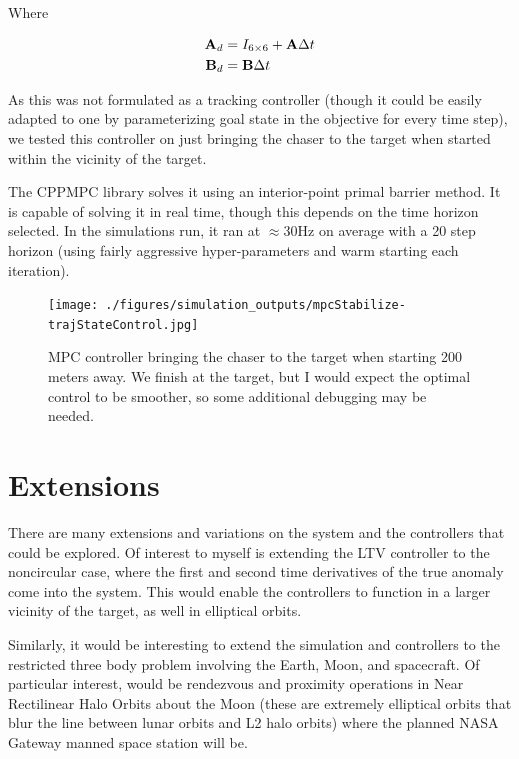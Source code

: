 \documentclass[conference]{IEEEtran}
\begin{document}
Where

\begin{equation}
    \label{eq:ltv}
    \begin{aligned}
        {\bf A}_d &= I_{6\times6} + {\bf A}\Delta t \\
        {\bf B}_d &= {\bf B}\Delta t
    \end{aligned}
\end{equation}

As this was not formulated as a tracking controller (though it could be easily
adapted to one by parameterizing goal state in the objective for every
time step), we tested this controller on just bringing the chaser to the target
when started within the vicinity of the target.

The CPPMPC library solves it using an interior-point primal barrier method. It
is capable of solving it in real time, though this depends on the time horizon
selected. In the simulations run, it ran at $\approx30$Hz on average with a 20
step horizon (using fairly aggressive hyper-parameters and warm starting each
iteration).

\begin{figure}[t]
    \centerline{\texttt{[image: ./figures/simulation\_outputs/mpcStabilize-trajStateControl.jpg]}}
    \caption{MPC controller bringing the chaser to the target when starting
    200 meters away. We finish at the target, but I would expect the optimal
    control to be smoother, so some additional debugging may be needed.}
    \label{fig:mpc}
\end{figure}


\section{Extensions}

There are many extensions and variations on the system and the controllers that
could be explored. Of interest to myself is extending the LTV
controller to the noncircular case, where the first and second time derivatives
of the true anomaly come into the system. This would enable the controllers to
function in a larger vicinity of the target, as well in elliptical orbits.

Similarly, it would be interesting to extend the simulation and controllers to
the restricted three body problem involving the Earth, Moon, and spacecraft. Of
particular interest, would be rendezvous and proximity operations in Near
Rectilinear Halo Orbits about the Moon (these are extremely elliptical orbits
that blur the line between lunar orbits and L2 halo orbits) where
the planned NASA Gateway manned space station will be.
\end{document}
